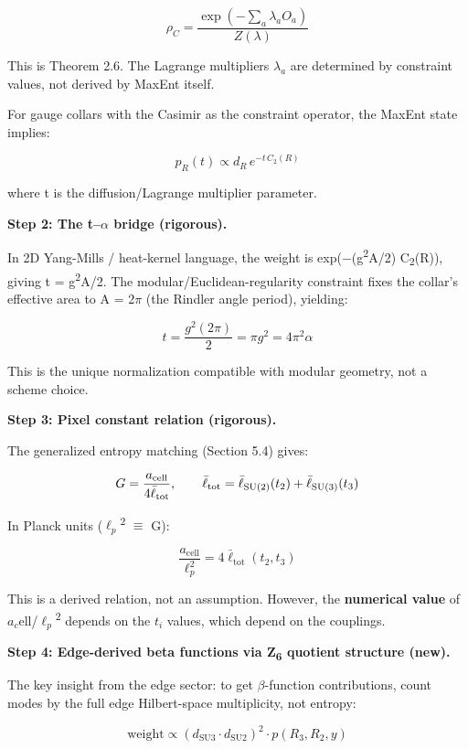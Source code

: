 \documentclass[11pt,a4paper]{article}
\theoremstyle{remark}
\begin{document}
\[
\rho_C = \frac{\exp(-\sum_a \lambda_a O_a)}{Z(\lambda)}
\]

This is Theorem 2.6. The Lagrange multipliers \(\ensuremath{\lambda}_a\) are determined by constraint values, not derived by MaxEnt itself.

For gauge collars with the Casimir as the constraint operator, the MaxEnt state implies:

\[
p_R(t) \propto d_R \, e^{-t \, C_2(R)}
\]

where t is the diffusion/Lagrange multiplier parameter.

\textbf{Step 2: The t--\ensuremath{\alpha} bridge (rigorous).}

In 2D Yang-Mills / heat-kernel language, the weight is exp(\ensuremath{-}(g\textsuperscript{2}A/2) C\textsubscript{2}(R)), giving t = g\textsuperscript{2}A/2. The modular/Euclidean-regularity constraint fixes the collar's effective area to A = 2\ensuremath{\pi} (the Rindler angle period), yielding:

\[
t = \frac{g^2(2\pi)}{2} = \pi g^2 = 4\pi^2 \alpha
\]

This is the unique normalization compatible with modular geometry, not a scheme choice.

\textbf{Step 3: Pixel constant relation (rigorous).}

The generalized entropy matching (Section 5.4) gives:

\[
G = \frac{a_\mathrm{cell}}{4\bar{\ell}_\mathrm{tot}}, \qquad
\bar{\ell}_\mathrm{tot} = \bar{\ell}_{\rm SU(2)}(t_2) + \bar{\ell}_{\rm SU(3)}(t_3)
\]

In Planck units (\(\ensuremath{\ell}_p\)\textsuperscript{2} \ensuremath{\equiv} G):

\[
\frac{a_\mathrm{cell}}{\ell_p^2} = 4\bar{\ell}_\mathrm{tot}(t_2, t_3)
\]

This is a derived relation, not an assumption. However, the \textbf{numerical value} of \(a_c\)ell/\(\ensuremath{\ell}_p\)\textsuperscript{2} depends on the \(t_i\) values, which depend on the couplings.

\textbf{Step 4: Edge-derived beta functions via Z\textsubscript{6} quotient structure (new).}

The key insight from the edge sector: to get \ensuremath{\beta}-function contributions, count modes by the full edge Hilbert-space multiplicity, not entropy:

\[
\text{weight} \propto (d_\mathrm{SU3} \cdot d_\mathrm{SU2})^2 \cdot p(R_3, R_2, y)
\]
\end{document}
